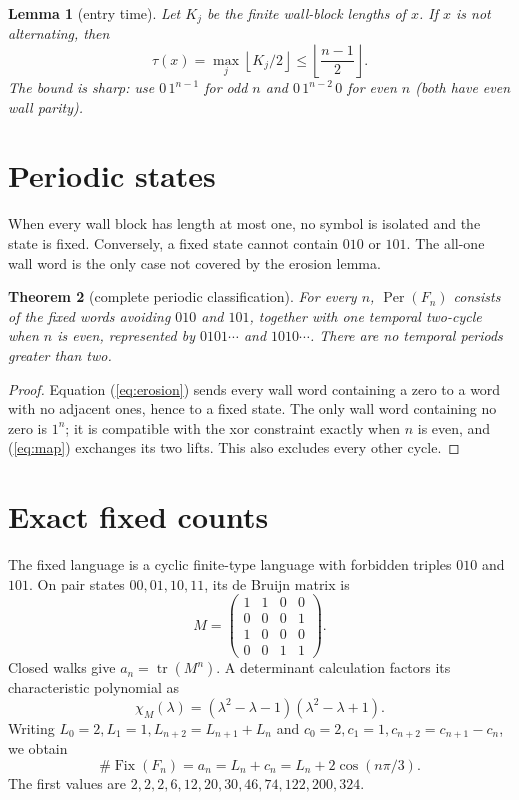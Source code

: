 \documentclass[10pt]{article}
\newtheorem{theorem}{Theorem}
\newtheorem{lemma}[theorem]{Lemma}
\newcommand{\Fix}{\operatorname{Fix}}
\newcommand{\Per}{\operatorname{Per}}
\begin{document}
\begin{lemma}[entry time]
Let $K_j$ be the finite wall-block lengths of $x$.  If $x$ is not alternating,
then
\begin{equation}
 \tau(x)=\max_j\left\lfloor K_j/2\right\rfloor
 \leq \left\lfloor\frac{n-1}{2}\right\rfloor .
 \label{eq:tau}
\end{equation}
The bound is sharp: use $0\,1^{n-1}$ for odd $n$ and
$0\,1^{n-2}\,0$ for even $n$ (both have even wall parity).
\end{lemma}

\section{Periodic states}
When every wall block has length at most one, no symbol is isolated and the
state is fixed.  Conversely, a fixed state cannot contain $010$ or $101$.
The all-one wall word is the only case not covered by the erosion lemma.

\begin{theorem}[complete periodic classification]
For every $n$, $\Per(F_n)$ consists of the fixed words avoiding $010$ and
$101$, together with one temporal two-cycle when $n$ is even, represented by
$0101\cdots$ and $1010\cdots$.  There are no temporal periods greater than
two.
\end{theorem}
\begin{proof}
Equation (\ref{eq:erosion}) sends every wall word containing a zero to a word
with no adjacent ones, hence to a fixed state.  The only wall word containing
no zero is $1^n$; it is compatible with the xor constraint exactly when $n$ is
even, and (\ref{eq:map}) exchanges its two lifts.  This also excludes every
other cycle.
\end{proof}

\section{Exact fixed counts}
The fixed language is a cyclic finite-type language with forbidden triples
$010$ and $101$.  On pair states $00,01,10,11$, its de Bruijn matrix is
\begin{equation}
 M=\begin{pmatrix}1&1&0&0\\0&0&0&1\\1&0&0&0\\0&0&1&1\end{pmatrix}.
 \label{eq:M}
\end{equation}
Closed walks give $a_n=\operatorname{tr}(M^n)$.  A determinant calculation
factors its characteristic polynomial as
\begin{equation}
 \chi_M(\lambda)=(\lambda^2-\lambda-1)(\lambda^2-\lambda+1).
 \label{eq:char}
\end{equation}
Writing $L_0=2,L_1=1,L_{n+2}=L_{n+1}+L_n$ and
$c_0=2,c_1=1,c_{n+2}=c_{n+1}-c_n$, we obtain
\begin{equation}
 \#\Fix(F_n)=a_n=L_n+c_n=L_n+2\cos(n\pi/3).
 \label{eq:fixed}
\end{equation}
The first values are $2,2,2,6,12,20,30,46,74,122,200,324$.
\end{document}

